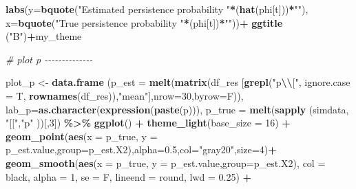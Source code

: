 \documentclass[
]{article}
\newenvironment{Shaded}{\begin{snugshade}}{\end{snugshade}}
\newcommand{\AttributeTok}[1]{\textcolor[rgb]{0.13,0.29,0.53}{#1}}
\newcommand{\CommentTok}[1]{\textcolor[rgb]{0.56,0.35,0.01}{\textit{#1}}}
\newcommand{\DecValTok}[1]{\textcolor[rgb]{0.00,0.00,0.81}{#1}}
\newcommand{\FloatTok}[1]{\textcolor[rgb]{0.00,0.00,0.81}{#1}}
\newcommand{\FunctionTok}[1]{\textcolor[rgb]{0.13,0.29,0.53}{\textbf{#1}}}
\newcommand{\NormalTok}[1]{#1}
\newcommand{\OtherTok}[1]{\textcolor[rgb]{0.56,0.35,0.01}{#1}}
\newcommand{\SpecialCharTok}[1]{\textcolor[rgb]{0.81,0.36,0.00}{\textbf{#1}}}
\newcommand{\StringTok}[1]{\textcolor[rgb]{0.31,0.60,0.02}{#1}}
\begin{document}
{\begin{Shaded}
\begin{Highlighting}[]
  \FunctionTok{labs}\NormalTok{(}\AttributeTok{y=}\FunctionTok{bquote}\NormalTok{(}\StringTok{"Estimated persistence probability "}\SpecialCharTok{*}\NormalTok{(}\FunctionTok{hat}\NormalTok{(phi[t]))}\SpecialCharTok{*}\StringTok{""}\NormalTok{),}
       \AttributeTok{x=}\FunctionTok{bquote}\NormalTok{(}\StringTok{"True persistence probability "}\SpecialCharTok{*}\NormalTok{(phi[t])}\SpecialCharTok{*}\StringTok{""}\NormalTok{))}\SpecialCharTok{+}
  \FunctionTok{ggtitle}\NormalTok{ (}\StringTok{"B"}\NormalTok{)}\SpecialCharTok{+}\NormalTok{my\_theme}



\CommentTok{\# plot p {-}{-}{-}{-}{-}{-}{-}{-}{-}{-}{-}{-}{-}{-}}

\NormalTok{plot\_p }\OtherTok{\textless{}{-}} \FunctionTok{data.frame}\NormalTok{ (}\AttributeTok{p\_est =} \FunctionTok{melt}\NormalTok{(}\FunctionTok{matrix}\NormalTok{(df\_res [}\FunctionTok{grepl}\NormalTok{(}\StringTok{"p}\SpecialCharTok{\textbackslash{}\textbackslash{}}\StringTok{["}\NormalTok{, }\AttributeTok{ignore.case =}\NormalTok{ T, }\FunctionTok{rownames}\NormalTok{(df\_res)),}\StringTok{"mean"}\NormalTok{],}\AttributeTok{nrow=}\DecValTok{30}\NormalTok{,}\AttributeTok{byrow=}\NormalTok{F)),}
                      \AttributeTok{lab\_p=}\FunctionTok{as.character}\NormalTok{(}\FunctionTok{expression}\NormalTok{(}\FunctionTok{paste}\NormalTok{(p))),}
                      \AttributeTok{p\_true =} \FunctionTok{melt}\NormalTok{(}\FunctionTok{sapply}\NormalTok{ (simdata, }\StringTok{"[["}\NormalTok{,}\StringTok{"p"}\NormalTok{ ))[,}\DecValTok{3}\NormalTok{]) }\SpecialCharTok{\%\textgreater{}\%}
  \FunctionTok{ggplot}\NormalTok{() }\SpecialCharTok{+}
  \FunctionTok{theme\_light}\NormalTok{(}\AttributeTok{base\_size =} \DecValTok{16}\NormalTok{) }\SpecialCharTok{+}
  \FunctionTok{geom\_point}\NormalTok{(}\FunctionTok{aes}\NormalTok{(}\AttributeTok{x =}\NormalTok{ p\_true, }\AttributeTok{y =}\NormalTok{ p\_est.value,}\AttributeTok{group=}\NormalTok{p\_est.X2),}\AttributeTok{alpha=}\FloatTok{0.5}\NormalTok{,}\AttributeTok{col=}\StringTok{"gray20"}\NormalTok{,}\AttributeTok{size=}\DecValTok{4}\NormalTok{)}\SpecialCharTok{+}
  \FunctionTok{geom\_smooth}\NormalTok{(}\FunctionTok{aes}\NormalTok{(}\AttributeTok{x =}\NormalTok{ p\_true, }\AttributeTok{y =}\NormalTok{ p\_est.value,}\AttributeTok{group=}\NormalTok{p\_est.X2), }\AttributeTok{col =} \StringTok{\textquotesingle{}black\textquotesingle{}}\NormalTok{, }\AttributeTok{alpha =} \DecValTok{1}\NormalTok{, }\AttributeTok{se =}\NormalTok{ F, }
              \AttributeTok{lineend =} \StringTok{\textquotesingle{}round\textquotesingle{}}\NormalTok{, }\AttributeTok{lwd =} \FloatTok{0.25}\NormalTok{) }\SpecialCharTok{+}

\end{Highlighting}
\end{Shaded}}
\end{document}
